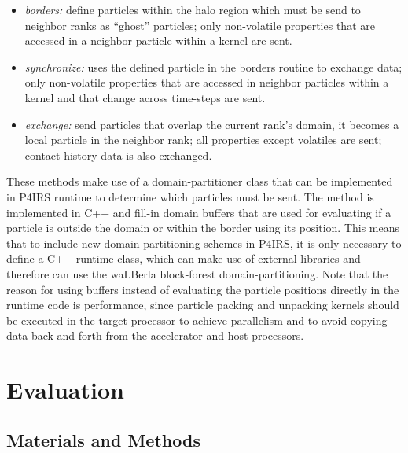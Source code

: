 \documentclass[Afour,sageh,times]{sagej}
\begin{document}
\begin{itemize}
    \item \emph{borders:} define particles within the halo region which must be send to neighbor ranks as ``ghost'' particles; only non-volatile properties that are accessed in a neighbor particle within a kernel are sent.
    \item \emph{synchronize:} uses the defined particle in the borders routine to exchange data; only non-volatile properties that are accessed in neighbor particles within a kernel and that change across time-steps are sent.
    \item \emph{exchange:} send particles that overlap the current rank's domain, it becomes a local particle in the neighbor rank; all properties except volatiles are sent; contact history data is also exchanged.
\end{itemize}

These methods make use of a domain-partitioner class that can be implemented in P4IRS runtime to determine which particles must be sent.
The method is implemented in C++ and fill-in domain buffers that are used for evaluating if a particle is outside the domain or within the border using its position.
This means that to include new domain partitioning schemes in P4IRS, it is only necessary to define a C++ runtime class, which can make use of external libraries and therefore can use the waLBerla block-forest domain-partitioning.
Note that the reason for using buffers instead of evaluating the particle positions directly in the runtime code is performance, since particle packing and unpacking kernels should be executed in the target processor to achieve parallelism and to avoid copying data back and forth from the accelerator and host processors.

\section{Evaluation}
\label{sec:evaluation}


\subsection{Materials and Methods}
\end{document}
